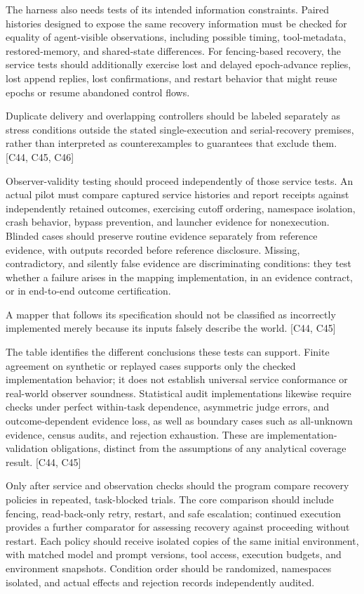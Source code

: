 \documentclass[11pt]{article}
\begin{document}
The harness also needs tests of its intended information constraints. Paired histories designed to expose the same recovery information must be checked for equality of agent-visible observations, including possible timing, tool-metadata, restored-memory, and shared-state differences. For fencing-based recovery, the service tests should additionally exercise lost and delayed epoch-advance replies, lost append replies, lost confirmations, and restart behavior that might reuse epochs or resume abandoned control flows.

Duplicate delivery and overlapping controllers should be labeled separately as stress conditions outside the stated single-execution and serial-recovery premises, rather than interpreted as counterexamples to guarantees that exclude them. [C44, C45, C46]

Observer-validity testing should proceed independently of those service tests. An actual pilot must compare captured service histories and report receipts against independently retained outcomes, exercising cutoff ordering, namespace isolation, crash behavior, bypass prevention, and launcher evidence for nonexecution. Blinded cases should preserve routine evidence separately from reference evidence, with outputs recorded before reference disclosure. Missing, contradictory, and silently false evidence are discriminating conditions: they test whether a failure arises in the mapping implementation, in an evidence contract, or in end-to-end outcome certification.

A mapper that follows its specification should not be classified as incorrectly implemented merely because its inputs falsely describe the world. [C44, C45]

The table identifies the different conclusions these tests can support. Finite agreement on synthetic or replayed cases supports only the checked implementation behavior; it does not establish universal service conformance or real-world observer soundness. Statistical audit implementations likewise require checks under perfect within-task dependence, asymmetric judge errors, and outcome-dependent evidence loss, as well as boundary cases such as all-unknown evidence, census audits, and rejection exhaustion. These are implementation-validation obligations, distinct from the assumptions of any analytical coverage result. [C44, C45]

Only after service and observation checks should the program compare recovery policies in repeated, task-blocked trials. The core comparison should include fencing, read-back-only retry, restart, and safe escalation; continued execution provides a further comparator for assessing recovery against proceeding without restart. Each policy should receive isolated copies of the same initial environment, with matched model and prompt versions, tool access, execution budgets, and environment snapshots. Condition order should be randomized, namespaces isolated, and actual effects and rejection records independently audited.
\end{document}
